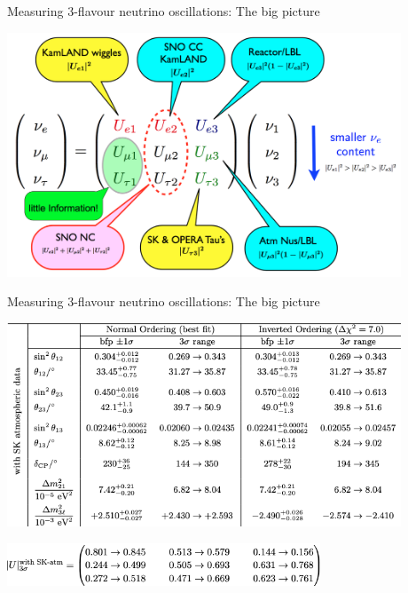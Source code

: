 %
%
%

\begin{frame}{Measuring 3-flavour neutrino oscillations: The big picture}

    \begin{center}
      \includegraphics[width=0.88\textwidth]{./images/osc101/upmns_expts_details}\\
    \end{center}

\end{frame}

%
%
%

\begin{frame}{Measuring 3-flavour neutrino oscillations: The big picture}

    \begin{center}
      \includegraphics[width=0.88\textwidth]{./images/osc101/nufit_params_v5_1}\\
    \end{center}

    \begin{center}
      \includegraphics[width=0.70\textwidth]{./images/osc101/nufit_pmns_v5_1}\\
    \end{center}

\end{frame}

